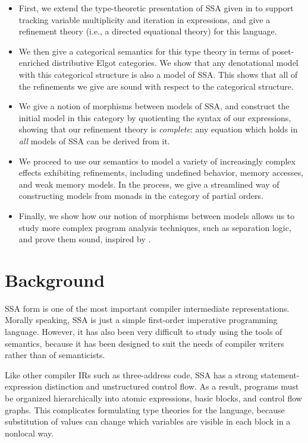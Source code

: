 \documentclass[acmsmall,screen,review]{acmart}
\begin{document}
\begin{itemize}
  \item First, we extend the type-theoretic presentation of SSA given in
  \citet{ghalayini-24-ssa-densem-arxiv} to support tracking variable multiplicity and iteration
  in expressions, and give a refinement theory (i.e., a directed equational theory) for this language. 
  \item We then give a categorical semantics for this type theory in terms of poset-enriched
  distributive Elgot categories. We show that any denotational model with this categorical structure
  is also a model of SSA. This shows that all of the refinements we give are sound with respect to
  the categorical structure.
  \item We give a notion of morphisms between models of SSA, and construct the initial model in this
  category by quotienting the syntax of our expressions, showing that our refinement theory is
  \emph{complete}: any equation which holds in \emph{all} models of SSA can be derived from it.
  \item We proceed to use our semantics to model a variety of increasingly complex effects
  exhibiting refinements, including undefined behavior, memory accesses, and weak memory models. In
  the process, we give a streamlined way of constructing models from monads in the category of
  partial orders.
  \item Finally, we show how our notion of morphisms between models allows us to study more complex
  program analysis techniques, such as separation logic, and prove them sound, inspired by
  \citet{mellies-ftrs}.
\end{itemize}

\section{Background}

SSA form is one of the most important compiler intermediate representations.
Morally speaking, SSA is just a simple first-order imperative programming language.
However, it has also been very difficult to study using the tools of semantics, because it has been designed to suit the needs of compiler writers rather than of semanticists.

Like other compiler IRs such as three-address code, SSA has a strong statement-expression distinction and unstructured control flow. As a result, programs must be organized hierarchically into atomic expressions, basic blocks, and control flow graphs. This complicates formulating type theories for the language, because substitution of values can change which variables are visible in each block in a nonlocal way. 
\end{document}
